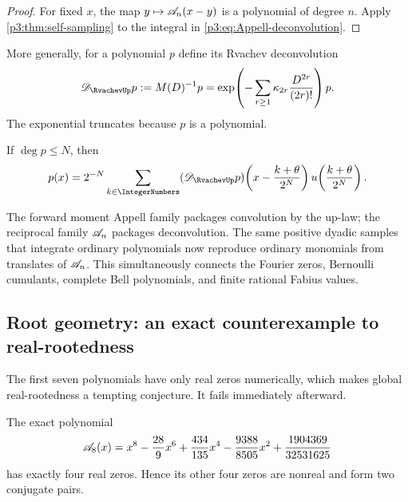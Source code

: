 \documentclass[11pt,oneside]{article}
\numberwithin{equation}{section}
\theoremstyle{definition}
\theoremstyle{remark}
\begin{document}
\begin{proof}
For fixed $x$, the map $y\mapsto\mathscr A_n(x-y)$ is a polynomial of degree $n$.  Apply \cref{p3:thm:self-sampling} to the integral in \eqref{p3:eq:Appell-deconvolution}.
\end{proof}

More generally, for a polynomial $p$ define its Rvachev deconvolution
\begin{equation}
 \mathscr D_{\RvachevUp}p
 :=M(D)^{-1}p
 =\exp\!\left(-\sum_{r\ge1}\kappa_{2r}
 \frac{D^{2r}}{(2r)!}\right)p.
 \label{p3:eq:polynomial-deconvolution}
\end{equation}
The exponential truncates because $p$ is a polynomial.

\begin{corollary}
\label{p3:cor:polynomial-deconvolution}
If $\deg p\le N$, then
\begin{equation}
 p(x)=2^{-N}\sum_{k\in\IntegerNumbers}
 (\mathscr D_{\RvachevUp}p)\!\left(x-\frac{k+\theta}{2^N}\right)
 u\!\left(\frac{k+\theta}{2^N}\right).
 \label{p3:eq:general-deconvolution-reproduction}
\end{equation}
\end{corollary}

\begin{resultbox}
The forward moment Appell family packages convolution by the up-law; the reciprocal family $\mathscr A_n$ packages deconvolution.  The same positive dyadic samples that integrate ordinary polynomials now reproduce ordinary monomials from translates of $\mathscr A_n$.  This simultaneously connects the Fourier zeros, Bernoulli cumulants, complete Bell polynomials, and finite rational Fabius values.
\end{resultbox}

\subsection{Root geometry: an exact counterexample to real-rootedness}

The first seven polynomials have only real zeros numerically, which makes global real-rootedness a tempting conjecture.  It fails immediately afterward.

\begin{proposition}
\label{p3:prop:A8-roots}
The exact polynomial
\begin{equation}
 \mathscr A_8(x)
 =x^8-\frac{28}{9}x^6+\frac{434}{135}x^4
 -\frac{9388}{8505}x^2+\frac{1904369}{32531625}
 \label{p3:eq:A8}
\end{equation}
has exactly four real zeros.  Hence its other four zeros are nonreal and form two conjugate pairs.
\end{proposition}
\end{document}
